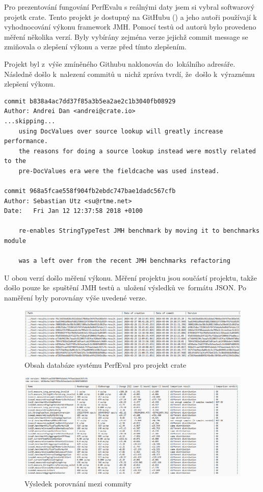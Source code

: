 Pro prezentování fungování PerfEvalu s reálnými daty jsem si vybral softwarový projetk crate.
Tento projekt je dostupný na GitHubu (\cite{crateDB}) a jeho autoři používají k vyhodnocování výkonu framework JMH.
Pomocí testů od autorů bylo provedeno měření několika verzí. Byly vybírány zejména verze jejichž
commit message se zmiňovala o zlepšení výkonu a verze před tímto zlepšením.

Projekt byl z~výše zmíněného Githubu naklonován do~lokálního adresáře. Následně došlo
k~nalezení commitů u~nichž zpráva tvrdí, že~došlo k~výraznému zlepšení výkonu.

\begin{lstlisting}
commit b838a4ac7dd37f85a3b5ea2ae2c1b3040fb08929
Author: Andrei Dan <andrei@crate.io>
...skipping...
    using DocValues over source lookup will greatly increase performance.
    the reasons for doing a source lookup instead were mostly related to the
    pre-DocValues era were the fieldcache was used instead.

commit 968a5fcae558f904fb2ebdc747bae1dadc567cfb
Author: Sebastian Utz <su@rtme.net>
Date:   Fri Jan 12 12:37:58 2018 +0100

    re-enables StringTypeTest JMH benchmark by moving it to benchmarks module

    was a left over from the recent JMH benchmarks refactoring

\end{lstlisting}

U obou verzí došlo měření výkonu. Měření projektu jsou součástí projektu, takže došlo
pouze ke~spuštění JMH testů a~uložení výsledků ve~formátu JSON. Po naměření byly porovnány
výše uvedené verze.

\begin{figure}[h!]
    \centering
    \includegraphics[width=1\textwidth]{../img/list-results-crate.png}
    \caption{Obsah databáze systému PerfEval pro projekt crate}
\end{figure}

\begin{figure}[h!]
    \centering
    \includegraphics[width=1\textwidth]{../img/version-comparison-nes.png}
    \caption{Výsledek porovnání mezi commity}
\end{figure}

